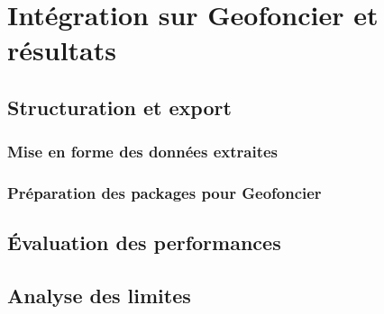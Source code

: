 \chapter{Intégration sur Geofoncier et résultats}

\section{Structuration et export}
\subsection{Mise en forme des données extraites}

\subsection{Préparation des packages pour Geofoncier}

\section{Évaluation des performances}

\section{Analyse des limites}

